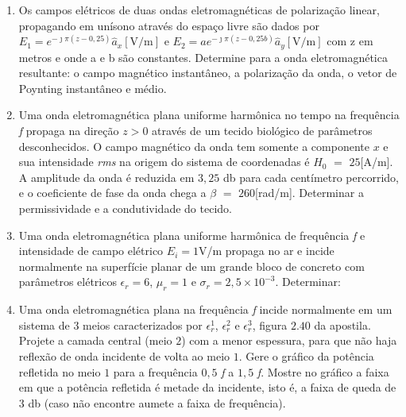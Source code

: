 \begin{enumerate}[1.]

\item Os campos elétricos de duas ondas eletromagnéticas de polarização linear, propagando em unísono através do espaço livre são dados por $E_{1} = e^{-\jmath \pi (z - 0,25)} \hat{a}_{x} [\si{\volt/\meter}]$ e $E_{2} = ae^{-\jmath \pi (z - 0,25b)} \hat{a}_{y} [\si{\volt/\meter}]$ com z em metros e onde a e b são constantes. Determine para a onda eletromagnética resultante: o campo magnético instantâneo, a polarização da onda, o vetor de Poynting instantâneo e médio.  

\item Uma onda eletromagnética plana uniforme harmônica no tempo na frequência \emph{f} propaga na direção $z > 0$ através de um tecido biológico de parâmetros desconhecidos. O campo magnético da onda tem somente a componente $x$ e sua intensidade \emph{rms} na origem do sistema de coordenadas é $H_{0}$ $=$ $25$\si{\milli}[\si{\ampere/\meter}]. A amplitude da onda é reduzida em $3,25$ \si{\decibel} para cada centímetro percorrido, e o coeficiente de fase da onda chega a $\beta$ $=$ $260$[\si{\radian/\meter}]. Determinar a permissividade e a condutividade do tecido.

\item Uma onda eletromagnética plana uniforme harmônica de frequência \emph{f} e intensidade de campo elétrico $E_{i} = 1$\si{\volt/\meter} propaga no ar e incide normalmente na superfície planar de um grande bloco de concreto com parâmetros elétricos $\epsilon_{r} = 6$, $\mu_{r} = 1$ e $\sigma_{r} = 2,5 \times 10^{-3}$. Determinar:


\item Uma onda eletromagnética plana na frequência \emph{f} incide normalmente em um sistema de $3$ meios caracterizados por $\epsilon^{1}_{r}$,  $\epsilon^{2}_{r}$ e $\epsilon^{3}_{r}$, figura $2.40$ da apostila. Projete a camada central (meio $2$) com a menor espessura, para que não haja reflexão de onda incidente de volta ao meio $1$. Gere o gráfico da potência refletida no meio $1$ para a frequência $0,5$ \emph{f} a $1,5$ \emph{f}. Mostre no gráfico a faixa em que a potência refletida é metade da incidente, isto é, a faixa de queda de $3$ \si{\decibel} (caso não encontre aumete a faixa de frequência).


\end{enumerate}
